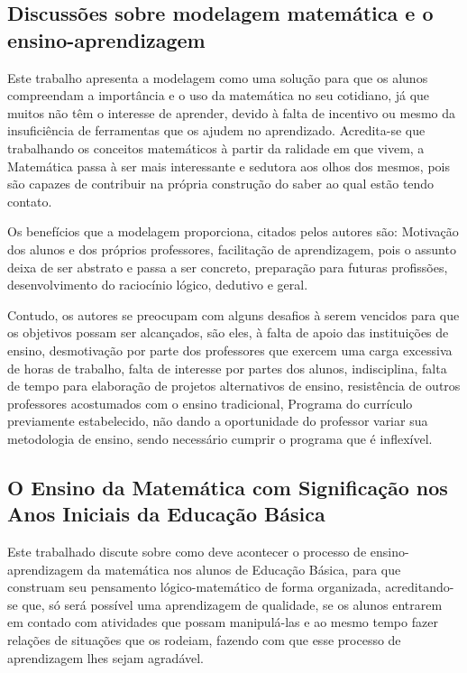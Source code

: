 \documentclass[12pt,a4paper]{article}
\begin{document}
\subsection{Discussões sobre modelagem matemática e o ensino-aprendizagem}
Este trabalho apresenta a modelagem como uma solução para que os alunos compreendam a importância e o uso da matemática no seu cotidiano, já que muitos não têm o interesse de aprender, devido à falta de incentivo ou mesmo da insuficiência de ferramentas que os ajudem no aprendizado. Acredita-se que trabalhando os conceitos matemáticos à partir da ralidade em que vivem, a Matemática passa à ser mais interessante e sedutora aos olhos dos mesmos, pois são capazes de contribuir na própria construção do saber ao qual estão tendo contato. 

Os benefícios que a modelagem proporciona, citados pelos autores são: Motivação dos alunos e dos próprios professores, facilitação de aprendizagem, pois o assunto deixa de ser abstrato e passa a ser concreto, preparação para futuras profissões, desenvolvimento do raciocínio lógico, dedutivo e geral. 

Contudo, os autores se preocupam com alguns desafios à serem vencidos para que os objetivos possam ser alcançados, são eles, à falta de apoio das instituições de ensino, desmotivação por parte dos professores que exercem uma carga excessiva de horas de trabalho, falta de interesse por partes dos alunos, indisciplina, falta de tempo para elaboração de projetos alternativos de ensino, resistência de outros professores acostumados com o ensino tradicional, Programa do currículo previamente estabelecido, não dando a oportunidade do professor variar sua metodologia de ensino, sendo necessário cumprir o programa que é inflexível.\citep{silveira2005discussoes}

\subsection{O Ensino da Matemática com Significação nos Anos Iniciais da Educação Básica}
Este trabalhado discute sobre como deve acontecer o processo de ensino-aprendizagem da matemática nos alunos de Educação Básica, para que construam seu pensamento lógico-matemático de forma organizada, acreditando-se que, só será possível uma aprendizagem de qualidade, se os alunos entrarem em contado com atividades que possam manipulá-las e ao mesmo tempo fazer relações de situações que os rodeiam, fazendo com que esse processo de aprendizagem lhes sejam agradável. 
\end{document}
